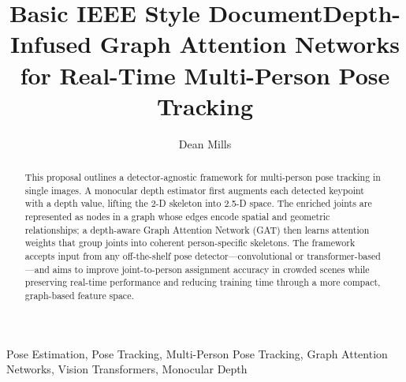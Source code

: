 \documentclass[conference,12pt,onecolumn,draftclsnofoot,a4paper]{IEEEtran}
\title{Basic IEEE Style Document}
\author{\IEEEauthorblockN{Dean Mills}
\IEEEauthorblockA{University of Pretoria\\
Email: u13081650@tuks.co.za}}
\begin{document}
\title{Depth-Infused Graph Attention Networks for Real-Time Multi-Person Pose Tracking}
\author{Dean Mills}



\maketitle

\begin{abstract} 
This proposal outlines a detector-agnostic framework for
multi-person pose tracking in single images. A monocular depth estimator first
augments each detected keypoint with a depth value, lifting the 2-D skeleton
into 2.5-D space. The enriched joints are represented as nodes in a graph whose
edges encode spatial and geometric relationships; a depth-aware Graph Attention
Network (GAT) then learns attention weights that group joints into coherent
person-specific skeletons. The framework accepts input from any off-the-shelf
pose detector—convolutional or transformer-based—and aims to improve
joint-to-person assignment accuracy in crowded scenes while preserving
real-time performance and reducing training time through a more compact,
graph-based feature space. 
\end{abstract}

\begin{IEEEkeywords}
    Pose Estimation, Pose Tracking, Multi-Person Pose Tracking, Graph Attention Networks, Vision Transformers, Monocular Depth
\end{IEEEkeywords}











{}

\end{document}
